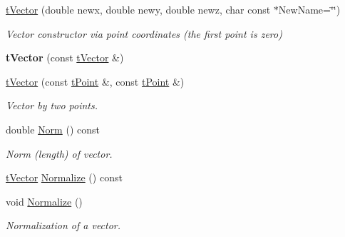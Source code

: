 \begin{DoxyCompactItemize}
\item 
\mbox{\label{classtVector_ad9dab835ddc33066445f3a00b77a0965}} 
\hyperlink{classtVector_ad9dab835ddc33066445f3a00b77a0965}{t\+Vector} (double newx, double newy, double newz, char const $\ast$New\+Name=\char`\"{}\char`\"{})
\begin{DoxyCompactList}\small\item\em Vector constructor via point coordinates (the first point is zero) \end{DoxyCompactList}\item 
\mbox{\label{classtVector_aed3e3026b2483d748d4652cd3e79296d}} 
{\bfseries t\+Vector} (const \hyperlink{classtVector}{t\+Vector} \&)
\item 
\mbox{\label{classtVector_a7dbffa8e340348bc896c578fd0335364}} 
\hyperlink{classtVector_a7dbffa8e340348bc896c578fd0335364}{t\+Vector} (const \hyperlink{classtPoint}{t\+Point} \&, const \hyperlink{classtPoint}{t\+Point} \&)
\begin{DoxyCompactList}\small\item\em Vector by two points. \end{DoxyCompactList}\item 
\mbox{\label{classtVector_a6573fc24ec1bfa80c6a5e21c1ea8be62}} 
double \hyperlink{classtVector_a6573fc24ec1bfa80c6a5e21c1ea8be62}{Norm} () const
\begin{DoxyCompactList}\small\item\em Norm (length) of vector. \end{DoxyCompactList}\item 
\hyperlink{classtVector}{t\+Vector} \hyperlink{classtVector_a6141302c1bbad21b64e56d93ed0408e5}{Normalize} () const
\item 
\mbox{\label{classtVector_a95d4d2975910e568033bd2a9d7df9c02}} 
void \hyperlink{classtVector_a95d4d2975910e568033bd2a9d7df9c02}{Normalize} ()
\begin{DoxyCompactList}\small\item\em Normalization of a vector. \end{DoxyCompactList}\item 
\mbox{\label{classtVector_accdeac1e568168edc72c3061f3f2c144}} 

\end{DoxyCompactItemize}
